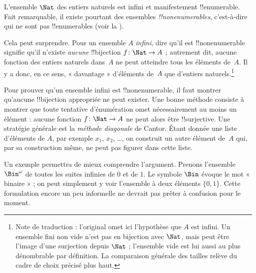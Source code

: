 \documentclass[11pt,a4paper,openany]{memoir}
\begin{document}
\begin{explain}
L'ensemble $\Nat$ des entiers naturels est infini et manifestement
!!{enumerable}. Fait remarquable, il existe pourtant des ensembles
\emph{!!{nonenumerable}s}, c'est-à-dire qui ne sont pas
!!{enumerable}s (voir la ).

Cela peut surprendre. Pour un ensemble $A$ \emph{infini}, dire
qu'il est !!{nonenumerable} signifie qu'il n'existe \emph{aucune}
!!{bijection} $f\colon \Nat \to A$ ; autrement dit, aucune
fonction des entiers naturels dans~$A$ ne peut atteindre tous
les éléments de~$A$. Il y a donc, en ce sens, « davantage »
d'éléments de~$A$ que d'entiers naturels.\footnote{Note de traduction :
l'original omet ici l'hypothèse que $A$ est infini. Un ensemble
fini non vide n'est pas en bijection avec $\Nat$, mais peut être
l'image d'une surjection depuis $\Nat$ ; l'ensemble vide est
lui aussi au plus dénombrable par définition. La comparaison
générale des tailles relève du cadre de choix précisé plus haut.}

Pour prouver qu'un ensemble infini est !!{nonenumerable}, il faut
montrer qu'aucune !!{bijection} appropriée ne peut exister. Une
bonne méthode consiste à montrer que toute tentative d'énumération
omet nécessairement au moins un élément : aucune fonction
$f\colon \Nat \to A$ ne peut alors être !!{surjective}.
Une stratégie générale est la \emph{méthode diagonale} de Cantor.
Étant donnée une liste d'éléments de $A$, par exemple $x_1$, $x_2$,
\dots, on construit un autre élément de~$A$ qui, par sa construction
même, ne peut pas figurer dans cette liste.

Un exemple permettra de mieux comprendre l'argument. Prenons
l'ensemble~$\Bin^\omega$ de toutes les suites infinies de $0$ et
de $1$. Le symbole $\Bin$ évoque le mot « binaire » ; on peut
simplement y voir l'ensemble à deux éléments $\{0,1\}$.
Cette formulation encore un peu informelle ne devrait pas prêter
à confusion pour le moment.
\end{explain}
\end{document}

